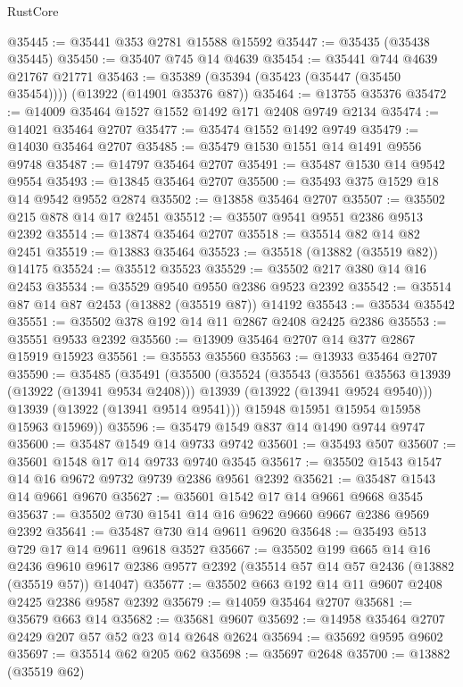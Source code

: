 \begin{lexlean}{RustCore}
\begin{coremodule}
@35445 := @35441 @353 @2781 @15588 @15592
@35447 := @35435 (@35438 @35445)
@35450 := @35407 @745 @14 @4639
@35454 := @35441 @744 @4639 @21767 @21771
@35463 := @35389 (@35394 (@35423 (@35447 (@35450 @35454)))) (@13922 (@14901 @35376 @87))
@35464 := @13755 @35376
@35472 := @14009 @35464 @1527 @1552 @1492 @171 @2408 @9749 @2134
@35474 := @14021 @35464 @2707
@35477 := @35474 @1552 @1492 @9749
@35479 := @14030 @35464 @2707
@35485 := @35479 @1530 @1551 @14 @1491 @9556 @9748
@35487 := @14797 @35464 @2707
@35491 := @35487 @1530 @14 @9542 @9554
@35493 := @13845 @35464 @2707
@35500 := @35493 @375 @1529 @18 @14 @9542 @9552 @2874
@35502 := @13858 @35464 @2707
@35507 := @35502 @215 @878 @14 @17 @2451
@35512 := @35507 @9541 @9551 @2386 @9513 @2392
@35514 := @13874 @35464 @2707
@35518 := @35514 @82 @14 @82 @2451
@35519 := @13883 @35464
@35523 := @35518 (@13882 (@35519 @82)) @14175
@35524 := @35512 @35523
@35529 := @35502 @217 @380 @14 @16 @2453
@35534 := @35529 @9540 @9550 @2386 @9523 @2392
@35542 := @35514 @87 @14 @87 @2453 (@13882 (@35519 @87)) @14192
@35543 := @35534 @35542
@35551 := @35502 @378 @192 @14 @11 @2867 @2408 @2425 @2386
@35553 := @35551 @9533 @2392
@35560 := @13909 @35464 @2707 @14 @377 @2867 @15919 @15923
@35561 := @35553 @35560
@35563 := @13933 @35464 @2707
@35590 := @35485
    (@35491
      (@35500
        (@35524
          (@35543
            (@35561 @35563 @13939 (@13922 (@13941 @9534 @2408)))
            @13939
            (@13922 (@13941 @9524 @9540)))
          @13939
          (@13922 (@13941 @9514 @9541)))
        @15948
        @15951
        @15954
        @15958
        @15963
        @15969))
@35596 := @35479 @1549 @837 @14 @1490 @9744 @9747
@35600 := @35487 @1549 @14 @9733 @9742
@35601 := @35493 @507
@35607 := @35601 @1548 @17 @14 @9733 @9740 @3545
@35617 := @35502 @1543 @1547 @14 @16 @9672 @9732 @9739 @2386 @9561 @2392
@35621 := @35487 @1543 @14 @9661 @9670
@35627 := @35601 @1542 @17 @14 @9661 @9668 @3545
@35637 := @35502 @730 @1541 @14 @16 @9622 @9660 @9667 @2386 @9569 @2392
@35641 := @35487 @730 @14 @9611 @9620
@35648 := @35493 @513 @729 @17 @14 @9611 @9618 @3527
@35667 := @35502
    @199
    @665
    @14
    @16
    @2436
    @9610
    @9617
    @2386
    @9577
    @2392
    (@35514 @57 @14 @57 @2436 (@13882 (@35519 @57)) @14047)
@35677 := @35502 @663 @192 @14 @11 @9607 @2408 @2425 @2386 @9587 @2392
@35679 := @14059 @35464 @2707
@35681 := @35679 @663 @14
@35682 := @35681 @9607
@35692 := @14958 @35464 @2707 @2429 @207 @57 @52 @23 @14 @2648 @2624
@35694 := @35692 @9595 @9602
@35697 := @35514 @62 @205 @62
@35698 := @35697 @2648
@35700 := @13882 (@35519 @62)

\end{coremodule}
\end{lexlean}
